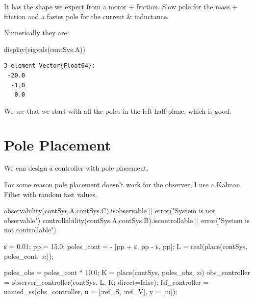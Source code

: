 \documentclass[
  a4paper,
  DIV=11,
  numbers=noendperiod]{scrreprt}
\newenvironment{Shaded}{\begin{snugshade}}{\end{snugshade}}
\newcommand{\ConstantTok}[1]{\textcolor[rgb]{0.56,0.35,0.01}{#1}}
\newcommand{\FloatTok}[1]{\textcolor[rgb]{0.68,0.00,0.00}{#1}}
\newcommand{\FunctionTok}[1]{\textcolor[rgb]{0.28,0.35,0.67}{#1}}
\newcommand{\NormalTok}[1]{\textcolor[rgb]{0.00,0.23,0.31}{#1}}
\newcommand{\OperatorTok}[1]{\textcolor[rgb]{0.37,0.37,0.37}{#1}}
\newcommand{\StringTok}[1]{\textcolor[rgb]{0.13,0.47,0.30}{#1}}
\begin{document}
It has the shape we expect from a motor + friction. Slow pole for the
mass + friction and a faster pole for the current \& inductance.

Numerically they are:

\begin{Shaded}
\begin{Highlighting}[]
\FunctionTok{display}\NormalTok{(}\FunctionTok{eigvals}\NormalTok{(contSys.A))}
\end{Highlighting}
\end{Shaded}

\begin{verbatim}
3-element Vector{Float64}:
 -20.0
  -1.0
   0.0
\end{verbatim}

We see that we start with all the poles in the left-half plane, which is
good.

\section{Pole Placement}\label{pole-placement-1}

We can design a controller with pole placement.

For some reason pole placement doesn't work for the observer, I use a
Kalman Filter with random fast values.

\begin{Shaded}
\begin{Highlighting}[]
\FunctionTok{observability}\NormalTok{(contSys.A,contSys.C).isobservable }\OperatorTok{||} \FunctionTok{error}\NormalTok{(}\StringTok{"System is not observable"}\NormalTok{)}
\FunctionTok{controllability}\NormalTok{(contSys.A,contSys.B).iscontrollable }\OperatorTok{||} \FunctionTok{error}\NormalTok{(}\StringTok{"System is not controllable"}\NormalTok{)}

\NormalTok{ε }\OperatorTok{=} \FloatTok{0.01}\NormalTok{;}
\NormalTok{pp }\OperatorTok{=} \FloatTok{15.0}\NormalTok{;}
\NormalTok{poles\_cont }\OperatorTok{=} \OperatorTok{{-}}\NormalTok{ [pp }\OperatorTok{+}\NormalTok{ ε, pp }\OperatorTok{{-}}\NormalTok{ ε, pp];}
\NormalTok{L }\OperatorTok{=} \FunctionTok{real}\NormalTok{(}\FunctionTok{place}\NormalTok{(contSys, poles\_cont, }\OperatorTok{:}\NormalTok{c));}


\NormalTok{poles\_obs }\OperatorTok{=}\NormalTok{ poles\_cont }\OperatorTok{*} \FloatTok{10.0}\NormalTok{;}
\NormalTok{K }\OperatorTok{=} \FunctionTok{place}\NormalTok{(contSys, poles\_obs, }\OperatorTok{:}\NormalTok{o)}
\NormalTok{obs\_controller }\OperatorTok{=} \FunctionTok{observer\_controller}\NormalTok{(contSys, L, K; direct}\OperatorTok{=}\ConstantTok{false}\NormalTok{);}
\NormalTok{fsf\_controller }\OperatorTok{=} \FunctionTok{named\_ss}\NormalTok{(obs\_controller, u }\OperatorTok{=}\NormalTok{ [}\OperatorTok{:}\NormalTok{ref\_S, }\OperatorTok{:}\NormalTok{ref\_V], y }\OperatorTok{=}\NormalTok{ [}\OperatorTok{:}\NormalTok{u]);}
\end{Highlighting}
\end{Shaded}
\end{document}
